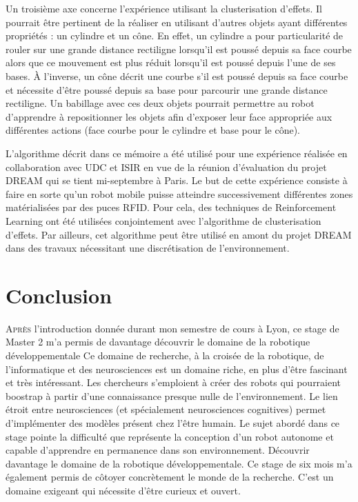 \documentclass[draft]{llncs}
\begin{document}
Un troisième axe concerne l'expérience utilisant la clusterisation d'effets.
Il pourrait être pertinent de la réaliser en utilisant d'autres objets ayant différentes propriétés : un cylindre et un cône.
En effet, un cylindre a pour particularité de rouler sur une grande distance rectiligne lorsqu'il est poussé depuis sa face courbe alors que ce mouvement est plus réduit lorsqu'il est poussé depuis l'une de ses bases.
À l'inverse, un cône décrit une courbe s'il est poussé depuis sa face courbe et nécessite d'être poussé depuis sa base pour parcourir une grande distance rectiligne. 
Un babillage avec ces deux objets pourrait permettre au robot d'apprendre à repositionner les objets afin d'exposer leur face appropriée aux différentes actions (face courbe pour le cylindre et base pour le cône).

L'algorithme décrit dans ce mémoire a été utilisé pour une expérience réalisée en collaboration avec UDC et ISIR en vue de la réunion d'évaluation du projet DREAM qui se tient mi-septembre à Paris. 
Le but de cette expérience consiste à faire en sorte qu'un robot mobile puisse atteindre successivement différentes zones matérialisées par des puces RFID.
Pour cela, des techniques de Reinforcement Learning ont été utilisées conjointement avec l'algorithme de clusterisation d'effets.
Par ailleurs, cet algorithme peut être utilisé en amont du projet DREAM dans des travaux nécessitant une discrétisation de l'environnement.





\section{Conclusion}



\lettrine{A}{près} l'introduction donnée durant mon semestre de cours à Lyon, ce stage de Master 2 m'a permis de davantage découvrir le domaine de la robotique développementale 
Ce domaine de recherche, à la croisée de la robotique, de l'informatique et des neurosciences est un domaine riche, en plus d'être fascinant et très intéressant.
Les chercheurs s'emploient à créer des robots qui pourraient boostrap à partir d'une connaissance presque nulle de l'environnement.
Le lien étroit entre neurosciences (et spécialement neurosciences cognitives) permet d'implémenter des modèles présent chez l'être humain.
Le sujet abordé dans ce stage pointe la difficulté que représente la conception d'un robot autonome et capable d'apprendre en permanence dans son environnement.
Découvrir davantage le domaine de la robotique développementale.
Ce stage de six mois m'a également permis de côtoyer concrètement le monde de la recherche.
C'est un domaine exigeant qui nécessite d'être curieux et ouvert.
\end{document}

